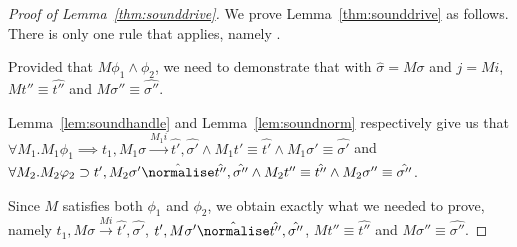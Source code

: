 \begin{proof}[Proof of Lemma~\ref{thm:sounddrive}]
  We prove Lemma~\ref{thm:sounddrive} as follows.
  There is only one rule that applies, namely .

  Provided that $M\phi_1\land\phi_2$, we need to demonstrate that  with $\hat{\sigma}=M\sigma$ and $j=M i$,
  $M t'' \equiv \hat{t''}$ and $M\sigma''\equiv \hat{\sigma''}$.


  Lemma~\ref{lem:soundhandle} and Lemma~\ref{lem:soundnorm} respectively give us that\\
$\forall M_1 . M_1 \phi_1 \implies t_1,M_1\sigma \xrightarrow[]{M_1 i} \hat{t'},\hat{\sigma'}\land M_1 t'\equiv\hat{t'}\land M_1\sigma' \equiv \hat{\sigma'}$ and \\
$\forall M_2 . M_2 \phi_2 \implies t',M_2\sigma' \hat{\normalise} \hat{t''},\hat{\sigma''}\land M_2 t''\equiv\hat{t''}\land M_2\sigma'' \equiv \hat{\sigma''}$.

Since $M$ satisfies both $\phi_1$ and $\phi_2$,
we obtain exactly what we needed to prove,
namely
$t_1,M\sigma \xrightarrow[]{M i} \hat{t'},\hat{\sigma'}$,
$t',M\sigma' \hat{\normalise} \hat{t''},\hat{\sigma''}$,
$M t'' \equiv \hat{t''}$ and $M\sigma''\equiv \hat{\sigma''}$.

\end{proof}
